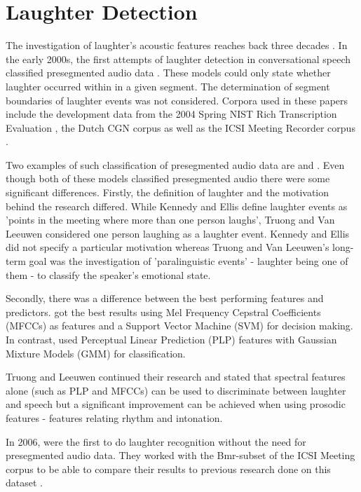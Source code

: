 \documentclass[bsc,frontabs,parskip,deptreport]{infthesis}
\begin{document}
\section{Laughter Detection} \label{sec:bg-laughter}
The investigation of laughter's acoustic features reaches back three decades \citep{bickley1992acoustic}.
In the early 2000s, the first attempts of laughter detection in conversational speech classified presegmented audio data \citep{kennedy2004laughter, truong2005automatic}. These models could only state whether laughter occurred within in a given segment. The determination of segment boundaries of laughter events was not considered. 
Corpora used in these papers include the development data from the 2004 Spring NIST Rich Transcription Evaluation \citep{ldcnistcorpus}, the Dutch CGN corpus \citep{oostdijk2000spoken} as well as the ICSI Meeting Recorder corpus \citep{morgan2001meeting}. 

Two examples of such classification of presegmented audio data are \citeauthor{kennedy2004laughter} and \citeauthor{truong2005automatic}. 
Even though both of these models classified presegmented audio there were some significant differences. 
Firstly, the definition of laughter and the motivation behind the research differed.
While Kennedy and Ellis define laughter events as 'points in the meeting where more than one person laughs', Truong and Van Leeuwen considered one person laughing as a laughter event.
Kennedy and Ellis did not specify a particular motivation whereas Truong and Van Leeuwen's long-term goal was the investigation of 'paralinguistic events' - laughter being one of them - to classify the speaker's emotional state.   

Secondly, there was a difference between the best performing features and predictors.  
\citeauthor{kennedy2004laughter} got the best results using Mel Frequency Cepstral Coefficients (MFCCs) as features and a Support Vector Machine (SVM) for decision making. 
In contrast, \citeauthor{truong2005automatic} used Perceptual Linear Prediction (PLP) features with Gaussian Mixture Models (GMM) for classification. 

Truong and Leeuwen  continued their research \citep{truong2007automatic} and stated that spectral features alone (such as PLP and MFCCs) can be used to discriminate between laughter and speech but a significant improvement can be achieved when using prosodic features - features relating rhythm and intonation.

In 2006, \citeauthor{knox2006automatic} were the first to do laughter recognition without the need for presegmented audio data.  
They worked with the Bmr-subset of the ICSI Meeting corpus \citep{morgan2001meeting} to be able to compare their results to previous research done on this dataset \citep{kennedy2004laughter, truong2005automatic, truong2007automatic}.
\end{document}
